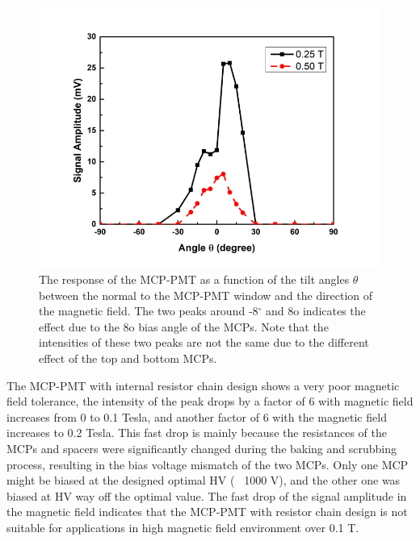 \documentclass[preprint,5p]{elsarticle}
\begin{document}
\begin{figure}[tbp]
\centering \includegraphics[scale=0.7]{fig/LeXcUD.png}
\caption{The response of the MCP-PMT as a function of the tilt angles $\theta$ 
   between the normal to the MCP-PMT window and the direction of the magnetic 
   field.  The two peaks around -8$^{\circ}$ and 8o indicates the effect due to 
   the 8o bias angle of the MCPs. Note that the intensities of these two peaks 
   are not the same due to the different effect of the top and bottom MCPs. } 
   \label{fig:design}
\end{figure}

The MCP-PMT with internal resistor chain design shows a very poor magnetic 
field tolerance, the intensity of the peak drops by a factor of 6 with magnetic 
field increases from 0 to 0.1 Tesla, and another factor of 6 with the magnetic 
field increases to 0.2 Tesla. This fast drop is mainly because the resistances 
of the MCPs and spacers were significantly changed during the baking and 
scrubbing process, resulting in the bias voltage mismatch of the two MCPs. Only 
one MCP might be biased at the designed optimal HV (~ 1000 V), and the other 
one was biased at HV way off the optimal value. The fast drop of the signal 
amplitude in the magnetic field indicates that the MCP-PMT with resistor chain 
design is not suitable for applications in high magnetic field environment over 
0.1 T. 
\end{document}
